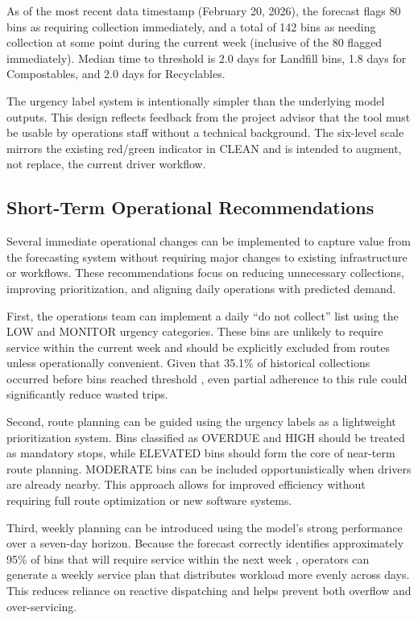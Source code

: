 \documentclass[11pt]{article}
\begin{document}
As of the most recent data timestamp (February 20, 2026), the forecast flags 80 bins as
requiring collection immediately, and a total of 142 bins as needing collection at some
point during the current week (inclusive of the 80 flagged immediately). Median time to
threshold is 2.0 days for Landfill bins, 1.8 days for Compostables, and 2.0 days for
Recyclables.

The urgency label system is intentionally simpler than the underlying model outputs. This
design reflects feedback from the project advisor that the tool must be usable by
operations staff without a technical background. The six-level scale mirrors the existing
red/green indicator in CLEAN and is intended to augment, not replace, the current driver
workflow.

\subsection{Short-Term Operational Recommendations}
Several immediate operational changes can be implemented to capture value from the forecasting system without requiring major changes to existing infrastructure or workflows. These recommendations focus on reducing unnecessary collections, improving prioritization, and aligning daily operations with predicted demand.

First, the operations team can implement a daily “do not collect” list using the LOW and MONITOR urgency categories. These bins are unlikely to require service within the current week and should be explicitly excluded from routes unless operationally convenient. Given that 35.1\% of historical collections occurred before bins reached threshold , even partial adherence to this rule could significantly reduce wasted trips.

Second, route planning can be guided using the urgency labels as a lightweight prioritization system. Bins classified as OVERDUE and HIGH should be treated as mandatory stops, while ELEVATED bins should form the core of near-term route planning. MODERATE bins can be included opportunistically when drivers are already nearby. This approach allows for improved efficiency without requiring full route optimization or new software systems.

Third, weekly planning can be introduced using the model’s strong performance over a seven-day horizon. Because the forecast correctly identifies approximately 95\% of bins that will require service within the next week , operators can generate a weekly service plan that distributes workload more evenly across days. This reduces reliance on reactive dispatching and helps prevent both overflow and over-servicing.
\end{document}
